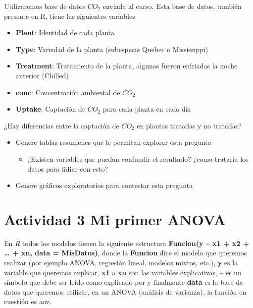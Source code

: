 \documentclass[]{book}
\providecommand{\tightlist}{%
  \setlength{\itemsep}{0pt}\setlength{\parskip}{0pt}}
\begin{document}
Utilizaremos base de datos \(CO_2\) \citep{potvin1990statistical} enviada al curso. Esta base de datos, también presente en R, tiene las siguientes variables

\begin{itemize}
\tightlist
\item
  \textbf{Plant}: Identidad de cada planta
\item
  \textbf{Type}: Variedad de la planta (subespecie Quebec o Mississippi)
\item
  \textbf{Treatment}: Tratamiento de la planta, algunas fueron enfriadas la noche anterior (Chilled)
\item
  \textbf{conc}: Concentración ambiental de \(CO_2\)
\item
  \textbf{Uptake}: Captación de \(CO_2\) para cada planta en cada día
\end{itemize}

¿Hay diferencias entre la captación de \(CO_2\) en plantas tratadas y no tratadas?

\begin{itemize}
\tightlist
\item
  Genere tablas resumenes que le permitan explorar esta pregunta

  \begin{itemize}
  \tightlist
  \item
    ¿Existen variables que puedan confundir el resultado? ¿como trataría los datos para lidiar con esto?
  \end{itemize}
\item
  Genere gráficos exploratorios para contestar esta pregunta
\end{itemize}

\hypertarget{actividad-3-mi-primer-anova}{%
\section{Actividad 3 Mi primer ANOVA}\label{actividad-3-mi-primer-anova}}

En \emph{R} todos los modelos tienen la siguiente estructura \textbf{Funcion(y \textasciitilde{} x1 + x2 + \ldots{} + xn, data = MisDatos)}, donde la \textbf{Funcion} dice el modelo que queremos realizar (por ejemplo ANOVA, regresión lineal, modelos mixtos, etc.), \textbf{y} es la variable que queremos explicar, \textbf{x1} a \textbf{xn} son las variables explicativas, \textbf{\textasciitilde{}} es un símbolo que debe ser leído como explicado por y finalmente \textbf{data} es la base de datos que queremos utilizar, en un ANOVA (análisis de varianza), la función en cuestión es aov.
\end{document}
